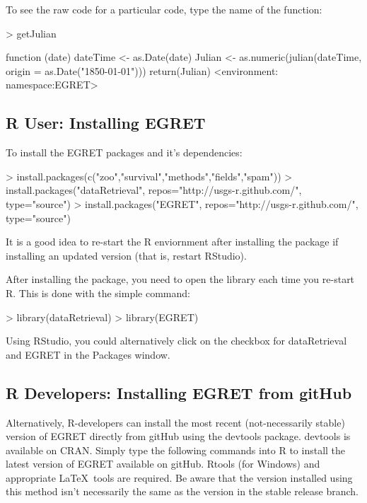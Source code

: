 \documentclass[a4paper,11pt]{article}
\begin{document}
To see the raw code for a particular code, type the name of the function:
\begin{Schunk}
\begin{Sinput}
> getJulian
\end{Sinput}
\begin{Soutput}
function (date) 
{
    dateTime <- as.Date(date)
    Julian <- as.numeric(julian(dateTime, origin = as.Date("1850-01-01")))
    return(Julian)
}
<environment: namespace:EGRET>
\end{Soutput}
\end{Schunk}


\subsection{R User: Installing EGRET}
To install the EGRET packages and it's dependencies:

\begin{Schunk}
\begin{Sinput}
> install.packages(c("zoo","survival","methods","fields","spam"))
> install.packages("dataRetrieval", repos="http://usgs-r.github.com/", 
                  type="source")
> install.packages("EGRET", repos="http://usgs-r.github.com/", 
                  type="source")
\end{Sinput}
\end{Schunk}

It is a good idea to re-start the R enviornment after installing the package if installing an updated version (that is, restart RStudio). 

After installing the package, you need to open the library each time you re-start R.  This is done with the simple command:
\begin{Schunk}
\begin{Sinput}
> library(dataRetrieval)
> library(EGRET)
\end{Sinput}
\end{Schunk}
Using RStudio, you could alternatively click on the checkbox for dataRetrieval and EGRET in the Packages window.

\subsection{R Developers: Installing EGRET from gitHub}
Alternatively, R-developers can install the most recent (not-necessarily stable) version of EGRET directly from gitHub using the devtools package.  devtools is available on CRAN.  Simply type the following commands into R to install the latest version of EGRET available on gitHub.  Rtools (for Windows) and appropriate \LaTeX\ tools are required. Be aware that the version installed using this method isn't necessarily the same as the version in the stable release branch.  
\end{document}

